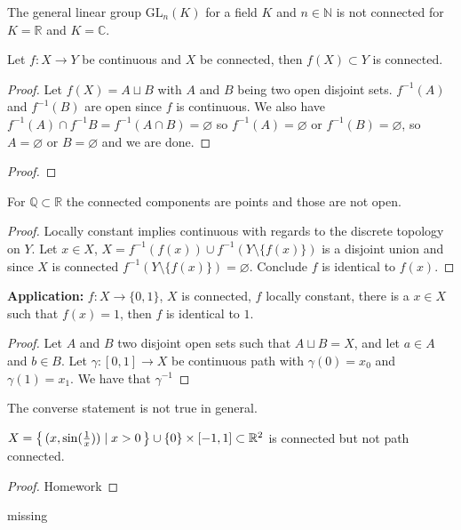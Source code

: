 \begin{example}
    The general linear group \(\mathrm{GL}_n(K)\) for a field \(K\) and \(n \in \mathbb{N}\) is not connected for \(K = \mathbb{R}\) and \(K = \mathbb{C}\).
\end{example}

\begin{remark}
    Let \(f: X \longrightarrow Y\) be continuous and \(X\) be connected, then \(f(X) \subset Y\) is connected.
\end{remark}
\begin{proof}
    Let \(f(X) = A \sqcup B\) with \(A\) and \(B\) being two open disjoint sets. \(f^{-1}(A)\) and \(f^{-1}(B)\) are open since \(f\) is continuous. We also have \(f^{-1}(A) \cap f^{-1}B = f^{-1}(A \cap B) = \varnothing\) so \(f^{-1}(A) = \varnothing\) or \(f^{-1}(B) = \varnothing\), so \(A = \varnothing\) or \(B = \varnothing\) and we are done.
\end{proof}
\begin{proof}
\end{proof}
\begin{example}
    For \(\mathbb{Q} \subset \mathbb{R}\) the connected components are points and those are not open.
\end{example}

\begin{proof}
    Locally constant implies continuous with regards to the discrete topology on \(Y\). Let \(x \in X\), \(X = f^{-1}(f(x)) \cup f^{-1}(Y \setminus \{f(x)\})\) is a disjoint union and since \(X\) is connected \(f^{-1}(Y \setminus \{f(x)\}) = \varnothing\). Conclude \(f\) is identical to \(f(x)\).
\end{proof}

\textbf{Application:} \(f: X \longrightarrow \{0, 1\}\), \(X\) is connected, \(f\) locally constant, there is a \(x \in X\) such that \(f(x) = 1\), then \(f\) is identical to \(1\).

\begin{proof}
    Let \(A\) and \(B\) two disjoint open sets such that \(A \sqcup B = X\), and let \(a \in A\) and \(b \in B\). Let \(\gamma: [0, 1] \longrightarrow X\) be continuous path with \(\gamma(0) = x_0\) and \(\gamma(1) = x_1\). We have that \(\gamma^{-1}\)
\end{proof}

\begin{remark}
    The converse statement is not true in general.
\end{remark}

\begin{example}
    \(X = \left\{\, (x, \sin(\frac{1}{x})) \mid x > 0 \,\right\} \cup \{0\} \times [-1, 1] \subset \mathbb{R}^2\) is connected but not path connected.
\end{example}
\begin{proof}
    Homework
\end{proof}
\begin{remark}
    missing
\end{remark}
